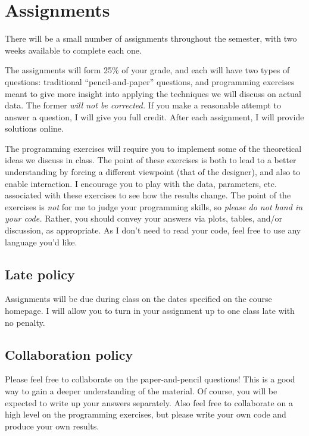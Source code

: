 \documentclass{article}
\begin{document}
\section*{Assignments}

There will be a small number of assignments throughout the semester, with two
weeks available to complete each one.

The assignments will form 25\% of your grade, and each will have two types of
questions: traditional ``pencil-and-paper'' questions, and programming exercises
meant to give more insight into applying the techniques we will discuss on
actual data.  The former \emph{will not be corrected.}  If you make a reasonable
attempt to answer a question, I will give you full credit.  After each
assignment, I will provide solutions online.

The programming exercises will require you to implement some of the theoretical
ideas we discuss in class.  The point of these exercises is both to lead to a
better understanding by forcing a different viewpoint (that of the designer),
and also to enable interaction.  I encourage you to play with the data,
parameters, etc. associated with these exercises to see how the results change.
The point of the exercises is \emph{not} for me to judge your programming
skills, so \emph{please do not hand in your code.}  Rather, you should convey
your answers via plots, tables, and/or discussion, as appropriate.  As I don't
need to read your code, feel free to use any language you'd like.

\subsection*{Late policy}

Assignments will be due during class on the dates specified on the course
homepage.  I will allow you to turn in your assignment up to one class late with
no penalty.

\subsection*{Collaboration policy}

Please feel free to collaborate on the paper-and-pencil questions!  This is a
good way to gain a deeper understanding of the material.  Of course, you will be
expected to write up your answers separately.  Also feel free to collaborate on
a high level on the programming exercises, but please write your own code and
produce your own results.
\end{document}
